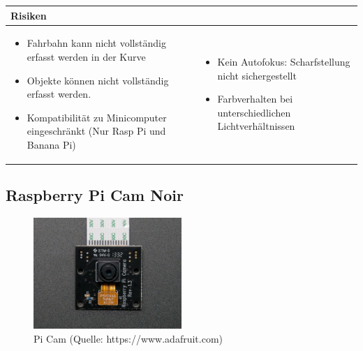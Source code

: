 \begin{table}[h]
\begin{tabular}{p{}p{}}


 \textbf{Risiken} & \\ \hline
	 
\begin{itemize}
\item Fahrbahn kann nicht vollständig erfasst werden in der Kurve
\item Objekte können nicht vollständig erfasst werden.
\item Kompatibilität zu Minicomputer eingeschränkt (Nur Rasp Pi und Banana Pi)
\end{itemize}
&
\begin{itemize}
\item Kein Autofokus: Scharfstellung nicht sichergestellt
\item Farbverhalten bei unterschiedlichen Lichtverhältnissen 
\end{itemize}

 
\end{tabular}
\end{table}

\pagebreak

\subsection{Raspberry Pi Cam Noir}

\begin{figure}[h!]%
\centering
\includegraphics[width=0.5\textwidth]{fig/raspberry-pi-camera-noir.jpg}
\caption{Pi Cam (Quelle: https://www.adafruit.com)}
\label{fig:PiCamNoir}
\end{figure}

